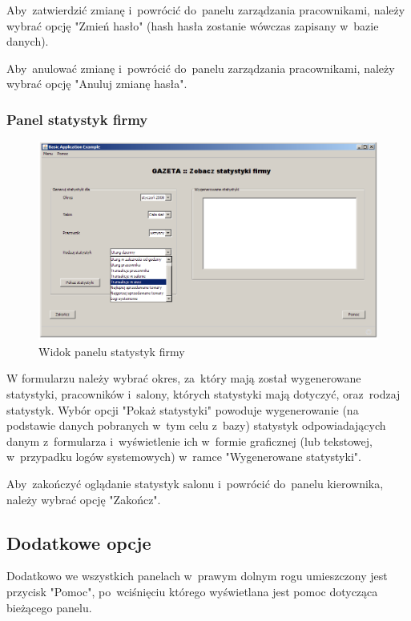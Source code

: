 Aby~zatwierdzić zmianę i~powrócić do~panelu zarządzania pracownikami, należy wybrać opcję "Zmień hasło" (hash hasła zostanie wówczas zapisany w~bazie danych).

Aby~anulować zmianę i~powrócić do~panelu zarządzania pracownikami, należy wybrać opcję "Anuluj zmianę hasła".
\subsubsection{Panel statystyk firmy}
\begin{figure}
\includegraphics[width=1\textwidth]{gfx/stat_firmy.png}
\caption{Widok panelu statystyk firmy}
\end{figure}
W formularzu należy wybrać okres, za~który mają został wygenerowane statystyki, pracowników i~salony, których statystyki mają dotyczyć, oraz~rodzaj statystyk. Wybór opcji "Pokaż statystyki" powoduje wygenerowanie (na podstawie danych pobranych w~tym celu z~bazy) statystyk odpowiadających danym z~formularza i~wyświetlenie ich w~formie graficznej (lub tekstowej, w~przypadku logów systemowych) w~ramce "Wygenerowane statystyki".

Aby~zakończyć oglądanie statystyk salonu i~powrócić do~panelu kierownika, należy wybrać opcję "Zakończ".
\subsection{Dodatkowe opcje}
Dodatkowo we wszystkich panelach w~prawym dolnym rogu umieszczony jest przycisk "Pomoc", po~wciśnięciu którego wyświetlana jest pomoc dotycząca bieżącego panelu.